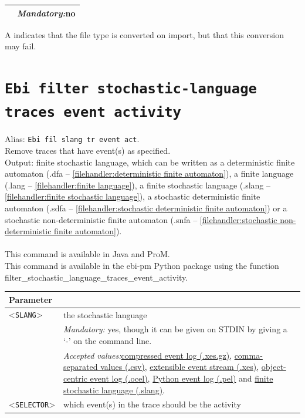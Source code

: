 {\begin{tabularx}{\linewidth}{lX}
&\textit{Mandatory:}\quad no\\
\bottomrule
\end{tabularx}
A \textdagger{} indicates that the file type is converted on import, but that this conversion may fail.
\clearpage\section{\texttt{Ebi filter stochastic-language traces event activity}}
\label{command:Ebi filter stochastic-language traces event activity}
Alias: \texttt{Ebi fil slang tr event act}.\\
Remove traces that have event(s) as specified.\\
\noindent Output: finite stochastic language, which can be written as a deterministic finite automaton (.dfa -- \cref{filehandler:deterministic finite automaton}), a finite language (.lang -- \cref{filehandler:finite language}), a finite stochastic language (.slang -- \cref{filehandler:finite stochastic language}), a stochastic deterministic finite automaton (.sdfa -- \cref{filehandler:stochastic deterministic finite automaton}) or a stochastic non-deterministic finite automaton (.snfa -- \cref{filehandler:stochastic non-deterministic finite automaton}).\\
\\This command is available in Java and ProM.
\\This command is available in the ebi-pm Python package using the function filter\_stochastic\_language\_traces\_event\_activity.
\begin{tabularx}{\linewidth}{lX}
\toprule
Parameter \\\midrule
<\texttt{SLANG}>&the stochastic language\\
&\textit{Mandatory:} \quad yes, though it can be given on STDIN by giving a `-' on the command line.\\
&\textit{Accepted values:}\quad \hyperref[filehandler:compressed event log]{compressed event log (.xes.gz)}, \hyperref[filehandler:comma-separated values]{comma-separated values (.csv)}, \hyperref[filehandler:extensible event stream]{extensible event stream (.xes)}, \hyperref[filehandler:object-centric event log]{object-centric event log (.ocel)}, \hyperref[filehandler:Python event log]{Python event log (.pel)} and \hyperref[filehandler:finite stochastic language]{finite stochastic language (.slang)}.\\
<\texttt{SELECTOR}>&which event(s) in the trace should be the activity\\

\end{tabularx}}
